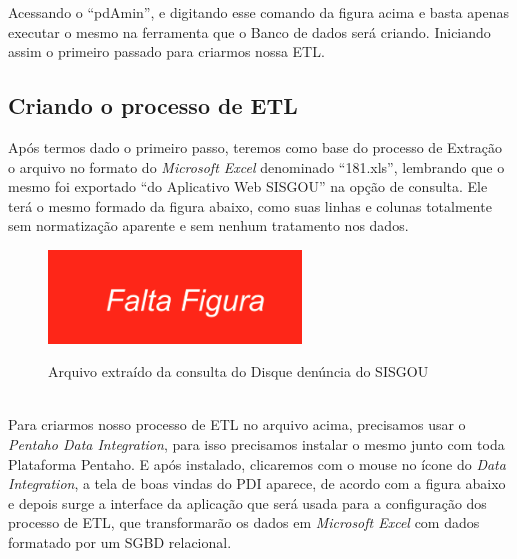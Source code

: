Acessando o ``pdAmin'', e digitando esse comando da figura acima e basta apenas executar o mesmo na ferramenta que o Banco de dados ser\'{a} criando. Iniciando assim o primeiro passado para criarmos nossa ETL.

\subsection{Criando o processo de ETL}

Ap\'os termos dado o primeiro passo, teremos como base do processo de Extra\c{c}\~{a}o o arquivo no formato do \textit{Microsoft Excel} denominado ``181.xls'', lembrando que o mesmo foi exportado ``do Aplicativo Web SISGOU'' na op\c{c}\~{a}o de consulta. 
Ele ter\'{a} o mesmo formado da figura abaixo, como suas linhas e colunas totalmente sem normatiza\c{c}\~{a}o aparente e sem nenhum tratamento nos dados.


\begin{figure}[H]
	\vspace*{0,2cm}
    \centering
    \caption{Arquivo extra\'{i}do da consulta do Disque denúncia do  SISGOU}
    \includegraphics[width=0.6\textwidth]{./04-figuras/falta-figura.png}
    \label{fig:ilustfigfaltafigura01}
\end{figure}
\vspace*{-0,9cm}
{\raggedright {}} \\

Para criarmos nosso processo de ETL no arquivo acima, precisamos usar o \textit{Pentaho Data Integration}, para isso precisamos instalar o mesmo junto com toda Plataforma Pentaho. E ap\'os instalado,  clicaremos com o mouse no \'{i}cone do \textit{Data Integration}, a tela de boas vindas do PDI aparece, de acordo com a figura abaixo e depois surge a interface da aplica\c{c}\~{a}o que ser\'{a} usada para a configura\c{c}\~{a}o dos processo de ETL, que transformar\~{a}o os dados em \textit{Microsoft Excel} com dados formatado por um SGBD relacional.

